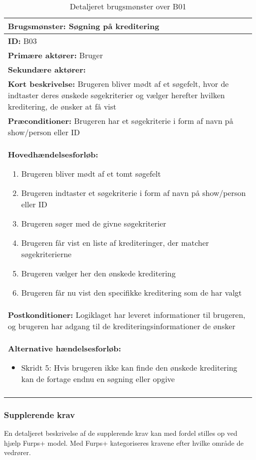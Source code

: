 \begin{longtable}{|p{150mm}|}
\hline
\textbf{Brugsmønster:} Søgning på kreditering\\ \hline
\textbf{ID:} B03         \\ \hline
\textbf{Primære aktører:} Bruger          \\ \hline
\textbf{Sekundære aktører:}        \\ \hline
\textbf{Kort beskrivelse:} Brugeren bliver mødt af et søgefelt, hvor de indtaster deres ønskede søgekriterier og vælger herefter hvilken kreditering, de ønsker at få vist         \\ \hline
\textbf{Præconditioner:} Brugeren har et søgekriterie i form af navn på show/person eller ID        \\ \hline
\textbf{Hovedhændelsesforløb:}
    \begin{enumerate}
    \setlength{\itemsep}{0pt}
        \item Brugeren bliver mødt af et tomt søgefelt
        \item Brugeren indtaster et søgekriterie i form af navn på show/person eller ID
        \item Brugeren søger med de givne søgekriterier
        \item Brugeren får vist en liste af krediteringer, der matcher søgekriterierne
        \item Brugeren vælger her den ønskede kreditering 
        \item Brugeren får nu vist den specifikke kreditering som de har valgt
    \end{enumerate}
\\ \hline
\textbf{Postkonditioner:} Logiklaget har leveret informationer til brugeren, og brugeren har adgang til de krediteringsinformationer de ønsker         \\ \hline
\textbf{Alternative hændelsesforløb:}
\begin{itemize}
    \item Skridt 5: Hvis brugeren ikke kan finde den ønskede kreditering kan de fortage endnu en søgning eller opgive
\end{itemize}\\ \hline
    \caption{Detaljeret brugsmønster over B01}
    \label{tab:Detaljeret_brugsmønsterdiagram_B01}

\end{longtable}

\subsubsection{Supplerende krav}
En detaljeret beskrivelse af de supplerende krav kan med fordel stilles op ved hjælp Furps+ model. Med Furps+ kategoriseres kravene efter hvilke område de vedrører. 



